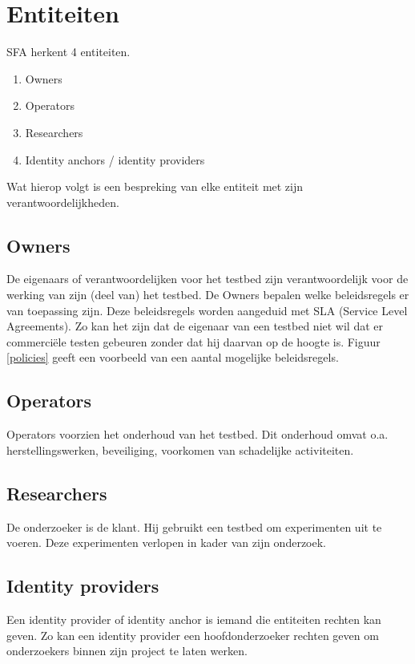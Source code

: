 \section{Entiteiten}
\npar
SFA herkent 4 entiteiten.
\begin{enumerate}
\item Owners
\item Operators
\item Researchers
\item Identity anchors / identity providers
\end{enumerate}
Wat hierop volgt is een bespreking van elke entiteit met zijn verantwoordelijkheden.

\subsection{Owners}
\npar
De eigenaars of verantwoordelijken voor het testbed zijn verantwoordelijk voor de werking van zijn (deel van) het testbed. De Owners bepalen welke beleidsregels er van toepassing zijn. Deze beleidsregels worden aangeduid met SLA (Service Level Agreements). Zo kan het zijn dat de eigenaar van een testbed niet wil dat er commerci\"ele testen gebeuren zonder dat hij daarvan op de hoogte is. Figuur \ref{policies} geeft een voorbeeld van een aantal mogelijke beleidsregels.

\subsection{Operators}
\npar
Operators voorzien het onderhoud van het testbed. Dit onderhoud omvat o.a. herstellingswerken, beveiliging, voorkomen van schadelijke activiteiten.

\subsection{Researchers}
\npar
De onderzoeker is de klant. Hij gebruikt een testbed om experimenten uit te voeren. Deze experimenten verlopen in kader van zijn onderzoek.

\subsection{Identity providers}
\npar
Een identity provider of identity anchor is iemand die entiteiten rechten kan geven. Zo kan een identity provider een hoofdonderzoeker rechten geven om onderzoekers binnen zijn project te laten werken.


